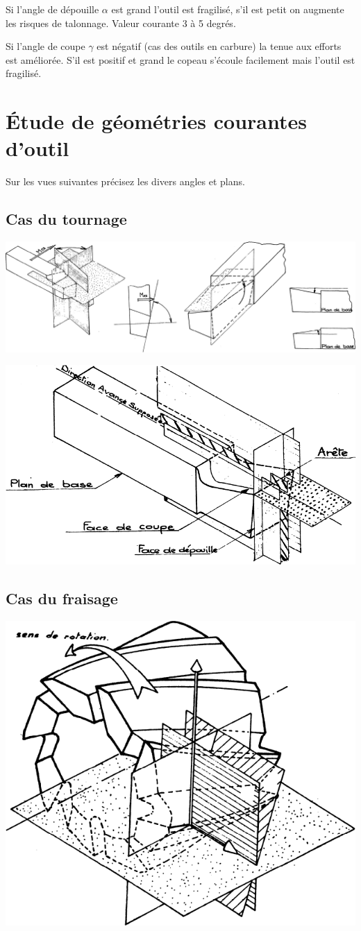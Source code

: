 \documentclass[11pt,oneside]{article}
\begin{document}
Si l'angle de dépouille $\alpha$ est grand l'outil est fragilisé, s'il est petit on augmente les risques de talonnage. Valeur courante 3 à 5 degrés.

Si l'angle de coupe  $\gamma$  est négatif (cas des outils en carbure) la tenue aux efforts est améliorée. S'il est positif et grand le copeau s'écoule facilement mais l'outil est fragilisé.


\section{Étude de géométries courantes d'outil}
Sur les vues suivantes précisez les divers angles et plans.

\subsection{Cas du tournage}
\begin{center}
\includegraphics[width=\textwidth]{png/fig_16}
\end{center}  

\begin{center}
\includegraphics[width=.5\textwidth]{png/fig_17}
\end{center}  
\subsection{Cas du fraisage}

\begin{center}
\includegraphics[width=.5\textwidth]{png/fig_18}
\end{center}  
\end{document}
